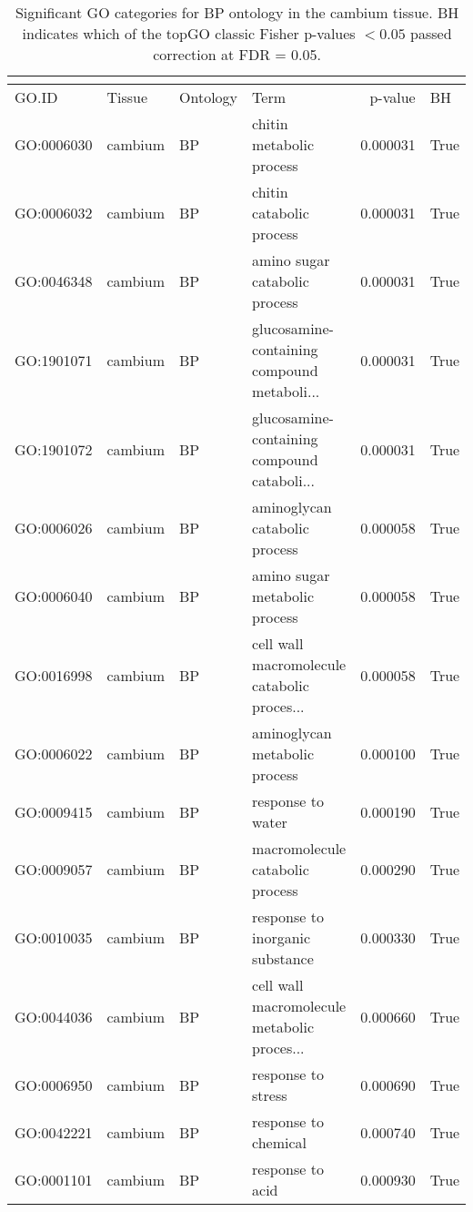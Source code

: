 \begin{longtable}{llllrl}
\caption{Significant GO categories for BP ontology in the cambium tissue. BH indicates which of the topGO classic Fisher p-values $< 0.05$ passed correction at FDR = 0.05.}\\
\label{tab:go-cambium-BP}\\
\toprule
GO.ID & Tissue & Ontology & Term & p-value & BH \\
\midrule
GO:0006030 & cambium & BP &                      chitin metabolic process  & 0.000031 &    True \\
GO:0006032 & cambium & BP &                      chitin catabolic process  & 0.000031 &    True \\
GO:0046348 & cambium & BP &                 amino sugar catabolic process  & 0.000031 &    True \\
GO:1901071 & cambium & BP &   glucosamine-containing compound metaboli...  & 0.000031 &    True \\
GO:1901072 & cambium & BP &   glucosamine-containing compound cataboli...  & 0.000031 &    True \\
GO:0006026 & cambium & BP &                 aminoglycan catabolic process  & 0.000058 &    True \\
GO:0006040 & cambium & BP &                 amino sugar metabolic process  & 0.000058 &    True \\
GO:0016998 & cambium & BP &   cell wall macromolecule catabolic proces...  & 0.000058 &    True \\
GO:0006022 & cambium & BP &                 aminoglycan metabolic process  & 0.000100 &    True \\
GO:0009415 & cambium & BP &                             response to water  & 0.000190 &    True \\
GO:0009057 & cambium & BP &               macromolecule catabolic process  & 0.000290 &    True \\
GO:0010035 & cambium & BP &               response to inorganic substance  & 0.000330 &    True \\
GO:0044036 & cambium & BP &   cell wall macromolecule metabolic proces...  & 0.000660 &    True \\
GO:0006950 & cambium & BP &                            response to stress  & 0.000690 &    True \\
GO:0042221 & cambium & BP &                          response to chemical  & 0.000740 &    True \\
GO:0001101 & cambium & BP &                              response to acid  & 0.000930 &    True \\

\end{longtable}

